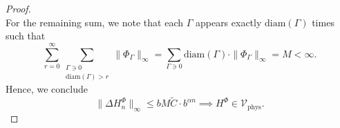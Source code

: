 \documentclass[10pt,a4paper]{amsart}
\newcommand{\diam}{\mathrm{diam}}
\newcommand{\phys}{\mathrm{phys}}
\begin{document}
\begin{proof}
\begin{equation}
    \end{equation}
    For the remaining sum, we note that each $\Gamma$ appears exactly $\diam(\Gamma)$ times such that
    \begin{equation}
        \sum_{r=0}^\infty\sum_{\substack{\Gamma\ni0\\\diam(\Gamma)>r}}\|\Phi_\Gamma\|_\infty=\sum_{\Gamma\ni0}\diam(\Gamma)\cdot\|\Phi_\Gamma\|_\infty=M<\infty.
    \end{equation}
    Hence, we conclude
    \begin{equation}
        \|\Delta H_n^\Phi\|_\infty\leq bM\tilde C\cdot b^{\alpha n}\implies H^\Phi\in \mathcal{V}_\phys.
    \end{equation}
\end{proof}
\end{document}
